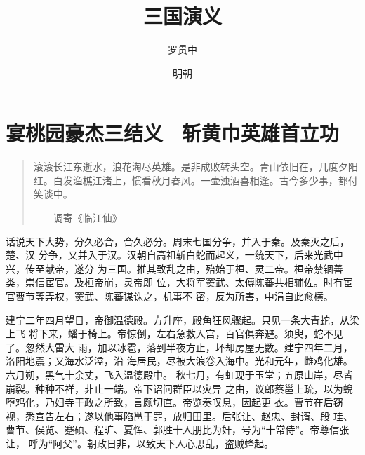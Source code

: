 \documentclass{ctexbook}
\title{三国演义}
\author{罗贯中}
\date{明朝}
\begin{document}
\maketitle

\tableofcontents

\pagestyle{headings}

\chapter{宴桃园豪杰三结义 \ 斩黄巾英雄首立功}
\begin{quotation}
滚滚长江东逝水，浪花淘尽英雄。是非成败转头空。青山依旧在，几度夕阳红。白发渔樵江渚上，惯看秋月春风。一壶浊酒喜相逢。古今多少事，都付笑谈中。

\begin{flushright}
——调寄《临江仙》
\end{flushright}

\end{quotation}


话说天下大势，分久必合，合久必分。周末七国分争，并入于秦。及秦灭之后，楚、汉
分争，又并入于汉。汉朝自高祖斩白蛇而起义，一统天下，后来光武中兴，传至献帝，遂分
为三国。推其致乱之由，殆始于桓、灵二帝。桓帝禁锢善类，崇信宦官。及桓帝崩，灵帝即
位，大将军窦武、太傅陈蕃共相辅佐。时有宦官曹节等弄权，窦武、陈蕃谋诛之，机事不
密，反为所害，中涓自此愈横。

建宁二年四月望日，帝御温德殿。方升座，殿角狂风骤起。只见一条大青蛇，从梁上飞
将下来，蟠于椅上。帝惊倒，左右急救入宫，百官俱奔避。须臾，蛇不见了。忽然大雷大
雨，加以冰雹，落到半夜方止，坏却房屋无数。建宁四年二月，洛阳地震；又海水泛溢，沿
海居民，尽被大浪卷入海中。光和元年，雌鸡化雄。六月朔，黑气十余丈，飞入温德殿中。
秋七月，有虹现于玉堂；五原山岸，尽皆崩裂。种种不祥，非止一端。帝下诏问群臣以灾异
之由，议郎蔡邕上疏，以为蜺堕鸡化，乃妇寺干政之所致，言颇切直。帝览奏叹息，因起更
衣。曹节在后窃视，悉宣告左右；遂以他事陷邕于罪，放归田里。后张让、赵忠、封谞、段
珪、曹节、侯览、蹇硕、程旷、夏恽、郭胜十人朋比为奸，号为“十常侍”。帝尊信张让，
呼为“阿父”。朝政日非，以致天下人心思乱，盗贼蜂起。
\end{document}
